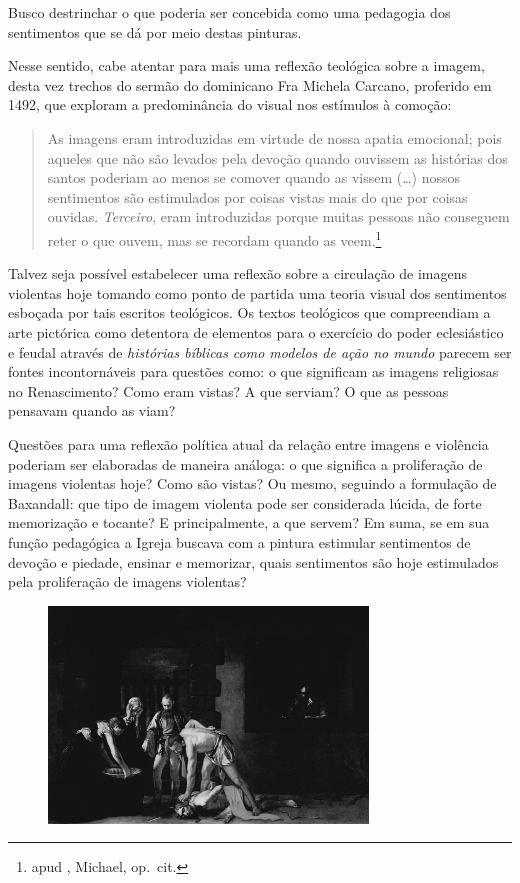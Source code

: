 Busco destrinchar o que poderia ser concebida como uma pedagogia dos
sentimentos que se dá por meio destas pinturas.


Nesse sentido, cabe atentar para mais uma reflexão teológica sobre a
imagem, desta vez trechos do sermão do dominicano Fra Michela Carcano,
proferido em 1492, que exploram a predominância do visual nos estímulos
à comoção:

\begin{quote}
As imagens eram introduzidas em virtude de nossa apatia
emocional; pois aqueles que não são levados pela devoção quando ouvissem
as histórias dos santos poderiam ao menos se comover quando as vissem
(\ldots{}) nossos sentimentos são estimulados por coisas vistas mais do que
por coisas ouvidas. \emph{Terceiro}, eram introduzidas porque muitas
pessoas não conseguem reter o que ouvem, mas se recordam quando as
veem.\footnote{ apud , Michael, op.~cit.}
\end{quote}

Talvez seja possível estabelecer uma reflexão sobre a circulação de
imagens violentas hoje tomando como ponto de partida uma teoria visual
dos sentimentos esboçada por tais escritos teológicos. Os textos
teológicos que compreendiam a arte pictórica como detentora de elementos
para o exercício do poder eclesiástico e feudal através de
\emph{histórias bíblicas como modelos de ação no mundo} parecem ser
fontes incontornáveis para questões como: o que significam as imagens
religiosas no Renascimento? Como eram vistas? A que serviam? O que as
pessoas pensavam quando as viam?

Questões para uma reflexão política atual da relação entre imagens e
violência poderiam ser elaboradas de maneira análoga: o que significa a
proliferação de imagens violentas hoje? Como são vistas? Ou mesmo,
seguindo a formulação de Baxandall: que tipo de imagem violenta pode ser
considerada lúcida, de forte memorização e tocante? E principalmente, a
que servem? Em suma, se em sua função pedagógica a Igreja
buscava com a pintura estimular sentimentos de devoção e
piedade, ensinar e memorizar, quais sentimentos são hoje estimulados
pela proliferação de imagens violentas?


\begin{figure}[!ht]
\centering
 \includegraphics[width=85mm]{./imgs/decapitacao.png}
\caption{\tiny{}}
\end{figure}

